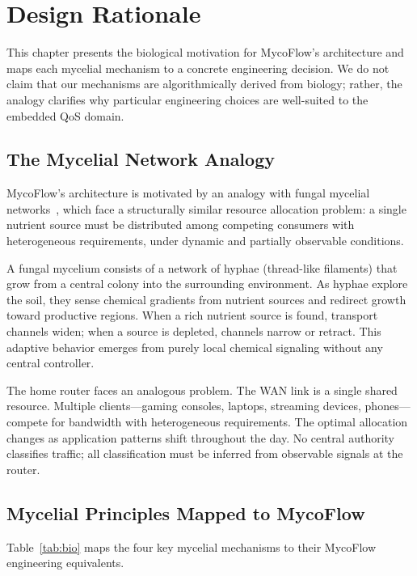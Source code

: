 
\chapter{Design Rationale}\label{chapter:design}

This chapter presents the biological motivation for MycoFlow's architecture and maps each mycelial mechanism to a concrete engineering decision. We do not claim that our mechanisms are algorithmically derived from biology; rather, the analogy clarifies why particular engineering choices are well-suited to the embedded QoS domain.

\section{The Mycelial Network Analogy}

MycoFlow's architecture is motivated by an analogy with fungal mycelial networks~\cite{fricker2017mycelium,fukasawa2023foraging}, which face a structurally similar resource allocation problem: a single nutrient source must be distributed among competing consumers with heterogeneous requirements, under dynamic and partially observable conditions.

A fungal mycelium consists of a network of hyphae (thread-like filaments) that grow from a central colony into the surrounding environment. As hyphae explore the soil, they sense chemical gradients from nutrient sources and redirect growth toward productive regions. When a rich nutrient source is found, transport channels widen; when a source is depleted, channels narrow or retract. This adaptive behavior emerges from purely local chemical signaling without any central controller.

The home router faces an analogous problem. The WAN link is a single shared resource. Multiple clients---gaming consoles, laptops, streaming devices, phones---compete for bandwidth with heterogeneous requirements. The optimal allocation changes as application patterns shift throughout the day. No central authority classifies traffic; all classification must be inferred from observable signals at the router.

\section{Mycelial Principles Mapped to MycoFlow}

Table~\ref{tab:bio} maps the four key mycelial mechanisms to their MycoFlow engineering equivalents.

